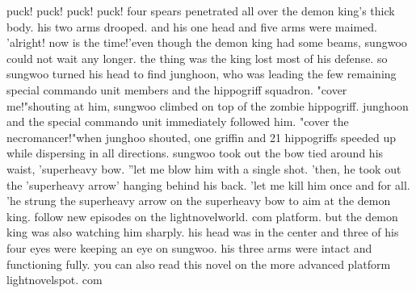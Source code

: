 puck! puck! puck! puck! four spears penetrated all over the demon king's thick body.
 his two arms drooped.
 and his one head and five arms were maimed.
'alright! now is the time!'even though the demon king had some beams, sungwoo could not wait any longer.
 the thing was the king lost most of his defense.
 so sungwoo turned his head to find junghoon, who was leading the few remaining special commando unit members and the hippogriff squadron.
"cover me!"shouting at him, sungwoo climbed on top of the zombie hippogriff.
 junghoon and the special commando unit immediately followed him.
 "cover the necromancer!"when junghoo shouted, one griffin and 21 hippogriffs speeded up while dispersing in all directions.
 sungwoo took out the bow tied around his waist, 'superheavy bow.
''let me blow him with a single shot.
'then, he took out the 'superheavy arrow' hanging behind his back.
'let me kill him once and for all.
'he strung the superheavy arrow on the superheavy bow to aim at the demon king.
follow new episodes on the lightnov‌elworld.
com platform.
but the demon king was also watching him sharply.
 his head was in the center and three of his four eyes were keeping an eye on sungwoo.
 his three arms were intact and functioning fully.
 you can also read this novel on the more advanced platform lightnovelspot.
com

 